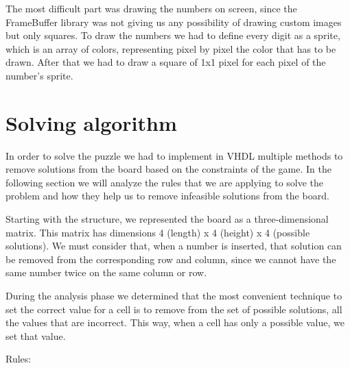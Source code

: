 \documentclass[12pt]{report}
\begin{document}
The most difficult part was drawing the numbers on screen, since the
FrameBuffer library was not giving us any possibility of drawing custom
images but only squares. To draw the numbers we had to define every digit
as a sprite, which is an array of colors, representing pixel by pixel the
color that has to be drawn. After that we had to draw a square of 1x1 pixel
for each pixel of the number's sprite.

\chapter*{Solving algorithm}

In order to solve the puzzle we had to implement in VHDL multiple methods
to remove solutions from the board based on the constraints of the game. In
the following section we will analyze the rules that we are applying to
solve the problem and how they help us to remove infeasible solutions from
the board.

Starting with the structure, we represented the board as
a three-dimensional matrix. This matrix has dimensions 4 (length)
x 4 (height) x 4 (possible solutions). We must consider that, when
a number is inserted, that solution can be removed from the corresponding
row and column, since we cannot have the same number twice on the same
column or row.

During the analysis phase we determined that the most convenient technique
to set the correct value for a cell is to remove from the set of possible
solutions, all the values that are incorrect. This way, when a cell has
only a possible value, we set that value.

Rules:
\end{document}
